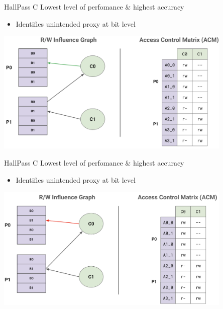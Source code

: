 \begin{frame}{HallPass C}
    Lowest level of perfomance \& highest accuracy
            \begin{itemize}
                \item Identifies unintended proxy at bit level
            \end{itemize}
            \centering
            \includegraphics[height=0.85\textheight,width=0.85\textwidth,keepaspectratio]{images/hallpass_c_slid1.png}
\end{frame}

\begin{frame}{HallPass C}
    Lowest level of perfomance \& highest accuracy
            \begin{itemize}
                \item Identifies unintended proxy at bit level
            \end{itemize}
            \centering
            \includegraphics[height=0.85\textheight,width=0.85\textwidth,keepaspectratio]{images/hallpass_c_slid2.png}
\end{frame}

